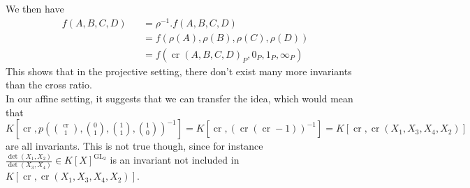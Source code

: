   We then have
  \begin{equation}
    \begin{aligned}
      &f(A,B,C,D)
      &&= \rho^{-1}.f (A,B,C,D)\\
      &&&= f(\rho(A),\rho(B),\rho(C),\rho(D))\\
      &&&= f(\operatorname{cr}(A,B,C,D)_P,0_P,1_P,\infty_P)
    \end{aligned}
  \end{equation}
  This shows that in the projective setting, there don't exist many more invariants than the cross ratio.  \\
  In our affine setting, it suggests that we can transfer the idea, which would mean that $K[\operatorname{cr},p(\binom{\operatorname{cr}}{1},\binom{0}{1},\binom{1}{1},\binom{1}{0})^{-1}] = K[\operatorname{cr},(\operatorname{cr}(\operatorname{cr}-1))^{-1}] = K[\operatorname{cr},\operatorname{cr}(X_1,X_3,X_4,X_2)]$ are all invariants.
  This is not true though, since for instance $\frac{\operatorname{det}(X_1,X_2)}{\operatorname{det}(X_3,X_4)} \in K[X]^{\operatorname{GL}_2}$ is an invariant not included in $K[\operatorname{cr},\operatorname{cr}(X_1,X_3,X_4,X_2)]$.
  
